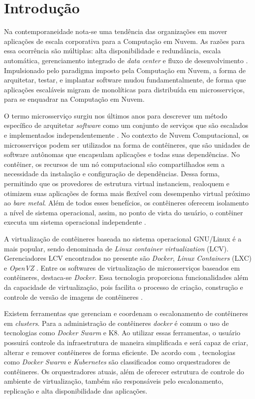 \chapter{Introdução}

Na contemporaneidade nota-se uma tendência das organizações em mover aplicações de escala corporativa para a Computação em Nuvem. As razões para essa ocorrência são múltiplas: alta disponibilidade e redundância, escala automática, gerenciamento integrado de \textit{data center} e fluxo de desenvolvimento \cite{Fritzsch}. Impulsionado pelo paradigma imposto pela Computação em Nuvem, a forma de arquitetar, testar, e implantar software mudou fundamentalmente, de forma que aplicações escaláveis migram de monolíticas para distribuída em microsserviços, para se enquadrar na Computação em Nuvem.

O termo microsserviço surgiu nos últimos anos para descrever um método específico de arquitetar \textit{software} como um conjunto de serviços que são escalados e implementados independentemente \cite{FowlerMicrosservice}. No contexto de Nuvem Computacional, os microsserviços podem ser utilizados na forma de contêineres, que são unidades de software autônomas que encapsulam aplicações e todas suas dependências. No contêiner, os recursos de um nó computacional são compartilhados sem a necessidade da instalação e configuração de dependências. Dessa forma, permitindo que os provedores de estrutura virtual instanciem, realoquem e otimizem suas aplicações de forma mais flexível com desempenho virtual próximo ao \textit{bare metal}. Além de todos esses benefícios, os contêineres oferecem isolamento a nível de sistema operacional, assim, no ponto de vista do usuário, o contêiner executa um sistema operacional independente \cite{Fazio2016, Assuno}. 

A virtualização de contêineres baseada no sistema operacional GNU/Linux é a mais popular, sendo denominada de \textit{Linux container virtualization} (LCV). Gerenciadores LCV encontrados no presente são \textit{Docker}, \textit{Linux Containers} (LXC) e \textit{OpenVZ} \cite{Fazio2016}. Entre os softwares de virtualização de microsserviços baseados em contêineres, destaca-se \textit{Docker}. Essa tecnologia proporciona funcionalidades além da capacidade de virtualização, pois facilita o processo de criação, construção e controle de versão de imagens de contêineres \cite{Redhat}.

Existem ferramentas que gerenciam e coordenam o escalonamento de contêineres em \textit{clusters}. Para a administração de contêineres \textit{docker} é comum o uso de tecnologias como \textit{Docker Swarm} e \ac{K8}. Ao utilizar essas ferramentas, o usuário possuirá controle da infraestrutura de maneira simplificada e será capaz de criar, alterar e remover contêineres de forma eficiente. De acordo com , tecnologias como \textit{Docker Swarm} e \textit{Kubernetes} são classificados como orquestradores de contêineres. Os orquestradores atuais, além de oferecer estrutura de controle do ambiente de virtualização, também são responsáveis pelo escalonamento, replicação e alta disponibilidade das aplicações. 

